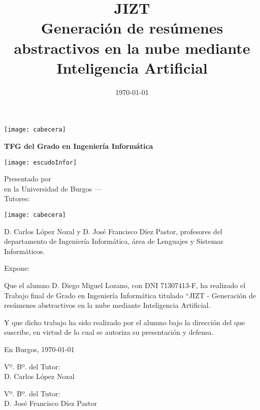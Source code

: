\documentclass[a4paper,12pt,twoside]{memoir}
\title{\fontsize{25}{25}\selectfont JIZT \\[0.5cm] \fontsize{15}{15}\selectfont Generación de resúmenes abstractivos en la nube mediante Inteligencia Artificial}
\author{\nombre}
\date{\today}
\makeatletter
\def\maketitle{
	\null
	\thispagestyle{empty}
	\noindent\texttt{[image: cabecera]}\vspace{1cm}%
	\vfill
	\colorbox{cpardoBox}{%
		\begin{minipage}{.8\textwidth}
			\vspace{.5cm}\Large
			\begin{center}
				\textbf{TFG del Grado en Ingeniería Informática}\vspace{.6cm}\\
				\textbf{\LARGE\@title{}}
			\end{center}
			\vspace{.2cm}
		\end{minipage}
		
	}%
	\hfill\begin{minipage}{.20\textwidth}
		\texttt{[image: escudoInfor]}
	\end{minipage}
	\vfill
	\begin{center}%
		{%
			\noindent\fontsize{18}{18}\selectfont
			Presentado por \@author{}\\ 
			en la Universidad de Burgos --- \@date{}\\
			Tutores: \@tutor{}\\
		}%
	\end{center}%
	\null
	\cleardoublepage
}
\newcommand{\nombre}{Diego Miguel Lozano} %
\makeatother
\begin{document}
	
	\maketitle
	
	
	\thispagestyle{empty}
	
	
	\noindent\texttt{[image: cabecera]}\vspace{1cm}
	
	\noindent D. Carlos López Nozal y D. José Francisco Díez Pastor, profesores del departamento de Ingeniería Informática, área de Lenguajes y Sistemas Informáticos.
	
	\noindent Expone:
	
	\noindent Que el alumno D. \nombre, con DNI 71307413-F, ha realizado el Trabajo final de Grado en Ingeniería Informática titulado ``JIZT - Generación de resúmenes abstractivos en la nube mediante Inteligencia Artificial. 
	
	\noindent Y que dicho trabajo ha sido realizado por el alumno bajo la dirección del que suscribe, en virtud de lo cual se autoriza su presentación y defensa.
	
	\begin{center} %
		En Burgos, {\large \today}
	\end{center}
	
	\vfill\vfill\vfill
	
	\begin{minipage}{0.45\textwidth}
		\begin{flushleft} %
			Vº. Bº. del Tutor:\\[2cm]
			D. Carlos López Nozal
		\end{flushleft}
	\end{minipage}
	\hfill
	\begin{minipage}{0.45\textwidth}
		\begin{flushleft} %
			Vº. Bº. del Tutor:\\[2cm]
			D. José Francisco Díez Pastor
		\end{flushleft}
	\end{minipage}
	\hfill
	
	\vfill
	
	
	
	\newpage\null\thispagestyle{empty}\newpage
	
	
	
\end{document}
